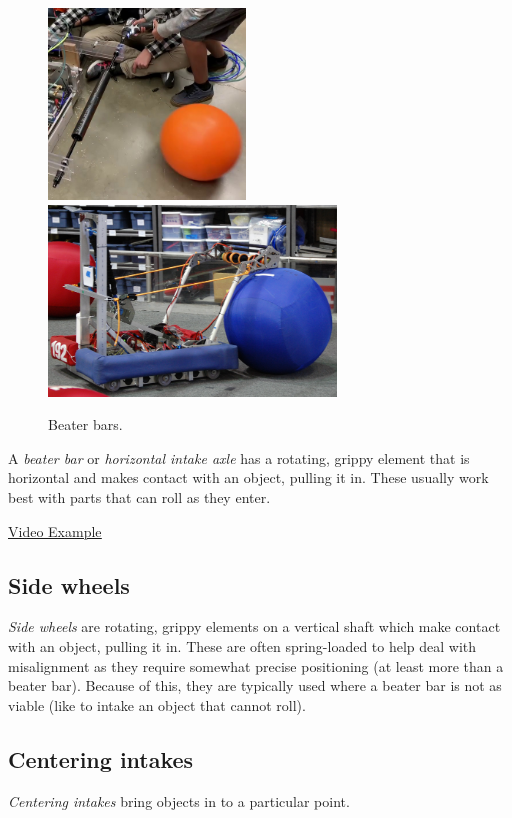 \begin{figure}[H]
	\includegraphics[height=2in]{imgs/intake_beaterbar_1.png}
	\includegraphics[height=2in]{imgs/intake_beaterbar_2.png}
	\caption{Beater bars.}
\end{figure}

A \textit{beater bar} or \textit{horizontal intake axle} has a rotating, grippy element that is horizontal and makes contact with an object, pulling it in. These usually work best with parts that can roll as they enter.

\href{https://www.youtube.com/watch?v=LaoZ8L7H65s}{\color{red}\underline{Video Example}}
\subsection{Side wheels}
\textit{Side wheels} are rotating, grippy elements on a vertical shaft which make contact with an object, pulling it in. These are often spring-loaded to help deal with misalignment as they require somewhat precise positioning (at least more than a beater bar). Because of this, they are typically used where a beater bar is not as viable (like to intake an object that cannot roll).
\subsection{Centering intakes}
\textit{Centering intakes} bring objects in to a particular point.

